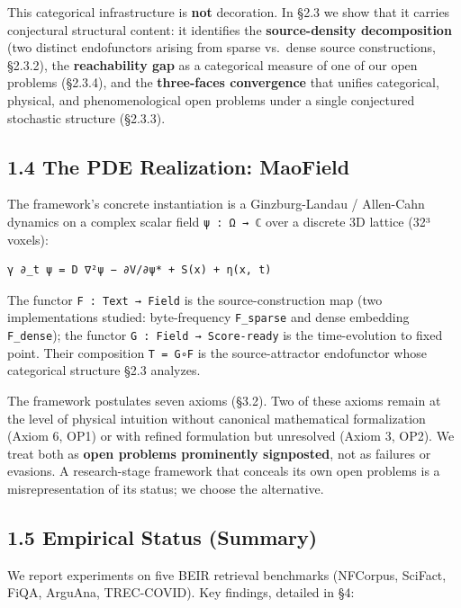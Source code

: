 \documentclass[
]{article}
\begin{document}
This categorical infrastructure is \textbf{not} decoration. In §2.3 we
show that it carries conjectural structural content: it identifies the
\textbf{source-density decomposition} (two distinct endofunctors arising
from sparse vs.~dense source constructions, §2.3.2), the
\textbf{reachability gap} as a categorical measure of one of our open
problems (§2.3.4), and the \textbf{three-faces convergence} that unifies
categorical, physical, and phenomenological open problems under a single
conjectured stochastic structure (§2.3.3).

\hypertarget{the-pde-realization-maofield}{%
\subsection{1.4 The PDE Realization:
MaoField}\label{the-pde-realization-maofield}}

The framework's concrete instantiation is a Ginzburg-Landau / Allen-Cahn
dynamics on a complex scalar field \texttt{ψ\ :\ Ω\ →\ ℂ} over a
discrete 3D lattice (32³ voxels):

\begin{verbatim}
γ ∂_t ψ = D ∇²ψ − ∂V/∂ψ* + S(x) + η(x, t)
\end{verbatim}

The functor \texttt{F\ :\ Text\ →\ Field} is the source-construction map
(two implementations studied: byte-frequency \texttt{F\_sparse} and
dense embedding \texttt{F\_dense}); the functor
\texttt{G\ :\ Field\ →\ Score-ready} is the time-evolution to fixed
point. Their composition \texttt{T\ =\ G∘F} is the source-attractor
endofunctor whose categorical structure §2.3 analyzes.

The framework postulates seven axioms (§3.2). Two of these axioms remain
at the level of physical intuition without canonical mathematical
formalization (Axiom 6, OP1) or with refined formulation but unresolved
(Axiom 3, OP2). We treat both as \textbf{open problems prominently
signposted}, not as failures or evasions. A research-stage framework
that conceals its own open problems is a misrepresentation of its
status; we choose the alternative.

\hypertarget{empirical-status-summary}{%
\subsection{1.5 Empirical Status
(Summary)}\label{empirical-status-summary}}

We report experiments on five BEIR retrieval benchmarks (NFCorpus,
SciFact, FiQA, ArguAna, TREC-COVID). Key findings, detailed in §4:
\end{document}
